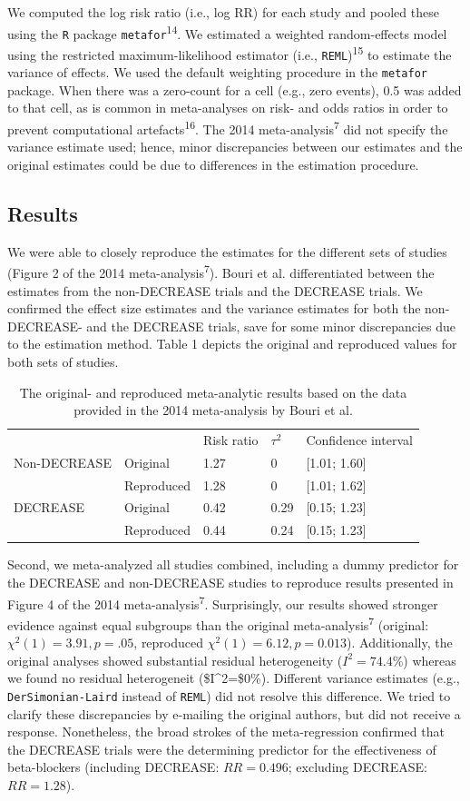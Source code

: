 \documentclass[]{article}
\begin{document}
We computed the log risk ratio (i.e., log RR) for each study and pooled
these using the \texttt{R} package \texttt{metafor}\textsuperscript{14}.
We estimated a weighted random-effects model using the restricted
maximum-likelihood estimator (i.e., \texttt{REML})\textsuperscript{15}
to estimate the variance of effects. We used the default weighting
procedure in the \texttt{metafor} package. When there was a zero-count
for a cell (e.g., zero events), 0.5 was added to that cell, as is common
in meta-analyses on risk- and odds ratios in order to prevent
computational artefacts\textsuperscript{16}. The 2014
meta-analysis\textsuperscript{7} did not specify the variance estimate
used; hence, minor discrepancies between our estimates and the original
estimates could be due to differences in the estimation procedure.

\subsection{Results}\label{results}

We were able to closely reproduce the estimates for the different sets
of studies (Figure 2 of the 2014 meta-analysis\textsuperscript{7}).
Bouri et al. differentiated between the estimates from the non-DECREASE
trials and the DECREASE trials. We confirmed the effect size estimates
and the variance estimates for both the non-DECREASE- and the DECREASE
trials, save for some minor discrepancies due to the estimation method.
Table 1 depicts the original and reproduced values for both sets of
studies.

\begin{longtable}[]{@{}lllll@{}}
\caption{The original- and reproduced meta-analytic results based on the
data provided in the 2014 meta-analysis by Bouri et al.}\tabularnewline
\toprule
& & Risk ratio & \(\tau^2\) & Confidence interval\tabularnewline
Non-DECREASE & Original & 1.27 & 0 & {[}1.01; 1.60{]}\tabularnewline
& Reproduced & 1.28 & 0 & {[}1.01; 1.62{]}\tabularnewline
DECREASE & Original & 0.42 & 0.29 & {[}0.15; 1.23{]}\tabularnewline
& Reproduced & 0.44 & 0.24 & {[}0.15; 1.23{]}\tabularnewline
\bottomrule
\end{longtable}

Second, we meta-analyzed all studies combined, including a dummy
predictor for the DECREASE and non-DECREASE studies to reproduce results
presented in Figure 4 of the 2014 meta-analysis\textsuperscript{7}.
Surprisingly, our results showed stronger evidence against equal
subgroups than the original meta-analysis\textsuperscript{7} (original:
\(\chi^2(1)=3.91,p=.05\), reproduced \(\chi^2(1)=6.12,p=0.013\)).
Additionally, the original analyses showed substantial residual
heterogeneity (\(I^2=74.4\)\%) whereas we found no residual heterogeneit
(\$I\^{}2=\$0\%). Different variance estimates (e.g.,
\texttt{DerSimonian-Laird} instead of \texttt{REML}) did not resolve
this difference. We tried to clarify these discrepancies by e-mailing
the original authors, but did not receive a response. Nonetheless, the
broad strokes of the meta-regression confirmed that the DECREASE trials
were the determining predictor for the effectiveness of beta-blockers
(including DECREASE: \(RR=0.496\); excluding DECREASE: \(RR=1.28\)).
\end{document}
